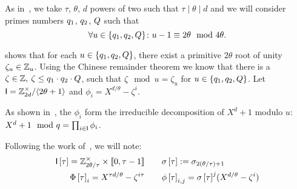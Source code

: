 As in~\cite{C:AttLyuSei20}, we take $\tau$, $\theta$, $d$ powers of two such that $\tau \mid \theta \mid d$ and
we will consider primes numbers $q_1$, $q_2$, $Q$ such that
\begin{equation}\label{eq:primes_rel_517}
	\forall u \in \{q_1, q_2, Q\}\colon u - 1 \equiv 2 \theta \mod 4\theta.
\end{equation}

\cite{C:AttLyuSei20} shows that for each $u \in \{q_1, q_2, Q\}$, there exist a
primitive $2\theta$ root of unity $\zeta_u \in {\mathbb{Z}}_u$.
Using the Chinese remainder theorem we know that there is a $\zeta \in \mathbb{Z},\: \zeta \leq q_1\cdot q_2\cdot Q$,
such that $\zeta \mod u = \zeta_u$ for $u\in\{q_1,q_2,Q\}$.
Let $\mathsf{I} = \mathbb{Z}^\times_{2d}/\langle2\theta + 1\rangle$ and $\phi_i = 
X^{d/\theta} - \zeta^i$.

	As shown in~\cite[Section2.2]{C:AttLyuSei20}, the $\phi_i$ form the irreducible decomposition of $X^d + 1$ modulo $u$:
		$X^d + 1 \mod q = \prod_{i\in \mathsf{I}}\phi_i$.
	
Following the work of~\cite{C:AttLyuSei20}, we will note:
	\begin{align*}
		 {\mathsf{I}\left[\tau\right]}= \mathbb{Z}^\times_{2\theta/\tau}\times \llbracket 0, \tau -
		 1\rrbracket \qquad &
		  {\sigma\left[\tau\right]} := \sigma_{2(\theta/\tau) + 1}                                   \\
		 {\Phi\left[\tau\right]}_i = X^{\tau d / \theta} - \zeta^{i \tau} \qquad &
		  {\phi\left[\tau\right]}_{i,j} = {\sigma\left[\tau\right]}^j(X^{d/\theta} - \zeta^i)               \\
	\end{align*}

